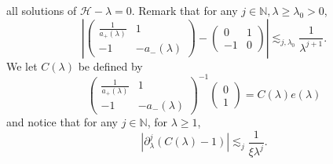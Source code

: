 \documentclass[11 pt]{amsart}
\theoremstyle{definition}
\theoremstyle{remark}
\numberwithin{equation}{section}
\begin{document}
all solutions of $\mathcal{H}- \lambda = 0$. Remark that for any $j \in
\mathbb{N}, \lambda \geqslant \lambda_0 > 0$,
\[ \left| \left(\begin{array}{cc}
     \frac{1}{a_+ (\lambda)} & 1\\
     - 1 & - a_- (\lambda)
   \end{array}\right) - \left(\begin{array}{cc}
     0 & 1\\
     - 1 & 0
   \end{array}\right) \right| \lesssim_{j, \lambda_0} \frac{1}{\lambda^{j +
   1}} . \]
We let $C(\lambda)$ be defined by
\begin{equation} \label{def:Clambda:constant}
\left(\begin{array}{cc}
       \frac{1}{a_+ (\lambda)} & 1\\
       - 1 & - a_- (\lambda)
     \end{array}\right)^{-1} \left(\begin{array}{c}
       0\\
       1
     \end{array}\right) = C (\lambda) e (\lambda) 
\end{equation}
and notice that for any $j \in \mathbb{N}$, for $\lambda\geq 1$,
\begin{equation} \label{def:Clambda:constant:bound} | \partial_{\lambda}^j (C (\lambda) - 1) | \lesssim_j \frac{1}{\xi \lambda^{j
     }}.
\end{equation}
\end{document}
